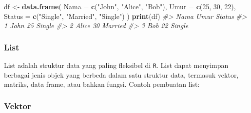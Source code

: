 \documentclass[
  oneside]{book}
\newenvironment{Shaded}{\begin{snugshade}}{\end{snugshade}}
\newcommand{\AttributeTok}[1]{\textcolor[rgb]{0.13,0.29,0.53}{#1}}
\newcommand{\CommentTok}[1]{\textcolor[rgb]{0.56,0.35,0.01}{\textit{#1}}}
\newcommand{\DecValTok}[1]{\textcolor[rgb]{0.00,0.00,0.81}{#1}}
\newcommand{\FunctionTok}[1]{\textcolor[rgb]{0.13,0.29,0.53}{\textbf{#1}}}
\newcommand{\NormalTok}[1]{#1}
\newcommand{\OtherTok}[1]{\textcolor[rgb]{0.56,0.35,0.01}{#1}}
\newcommand{\StringTok}[1]{\textcolor[rgb]{0.31,0.60,0.02}{#1}}
\begin{document}
\begin{Shaded}
\begin{Highlighting}[]
\NormalTok{df }\OtherTok{\textless{}{-}} \FunctionTok{data.frame}\NormalTok{(}
  \AttributeTok{Nama =} \FunctionTok{c}\NormalTok{(}\StringTok{"John"}\NormalTok{, }\StringTok{"Alice"}\NormalTok{, }\StringTok{"Bob"}\NormalTok{),}
  \AttributeTok{Umur =} \FunctionTok{c}\NormalTok{(}\DecValTok{25}\NormalTok{, }\DecValTok{30}\NormalTok{, }\DecValTok{22}\NormalTok{),}
  \AttributeTok{Status =} \FunctionTok{c}\NormalTok{(}\StringTok{"Single"}\NormalTok{, }\StringTok{"Married"}\NormalTok{, }\StringTok{"Single"}\NormalTok{)}
\NormalTok{)}
\FunctionTok{print}\NormalTok{(df)}
\CommentTok{\#\textgreater{}    Nama Umur  Status}
\CommentTok{\#\textgreater{} 1  John   25  Single}
\CommentTok{\#\textgreater{} 2 Alice   30 Married}
\CommentTok{\#\textgreater{} 3   Bob   22  Single}
\end{Highlighting}
\end{Shaded}

\subsubsection*{List}\label{list}

List adalah struktur data yang paling fleksibel di \texttt{R}. List dapat menyimpan berbagai jenis objek yang berbeda dalam satu struktur data, termasuk vektor, matriks, data frame, atau bahkan fungsi. Contoh pembuatan list:

\begin{Shaded}
\end{Shaded}

\subsubsection*{Vektor}\label{vektor-1}
\end{document}
